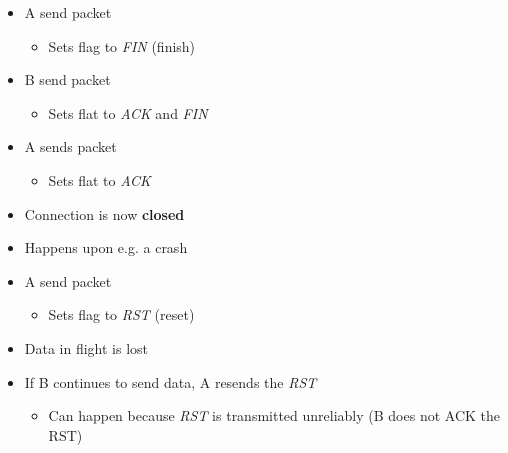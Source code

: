 \begin{itemize}
\begin{itemize}
\begin{itemize}
                    \item A send packet
                        \begin{itemize}
                            \item Sets flag to \textit{FIN} (finish)
                        \end{itemize}
                    \item B send packet
                        \begin{itemize}
                            \item Sets flat to \textit{ACK} and \textit{FIN}
                        \end{itemize}
                    \item A sends packet
                        \begin{itemize}
                            \item Sets flat to \textit{ACK}
                        \end{itemize}
                    \item Connection is now \textbf{closed}
                \end{itemize}
                \begin{itemize}
                    \item Happens upon e.g. a crash
                    \item A send packet
                        \begin{itemize}
                            \item Sets flag to \textit{RST} (reset)
                        \end{itemize}
                    \item Data in flight is lost
                    \item If B continues to send data, A resends the \textit{RST}
                        \begin{itemize}
                            \item Can happen because \textit{RST} is transmitted unreliably (B does not ACK the RST)
                        \end{itemize}
                \end{itemize}
        \end{itemize}
\end{itemize}

